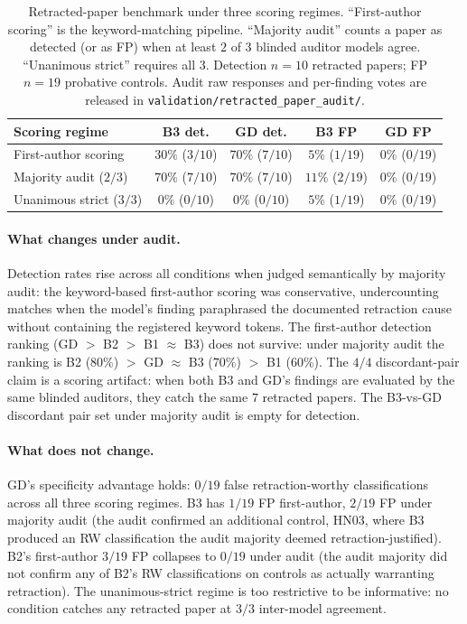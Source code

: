 \documentclass[11pt]{article}
\theoremstyle{definition}
\begin{document}
\begin{table}[ht]
\centering
\caption{Retracted-paper benchmark under three scoring regimes. ``First-author scoring'' is the keyword-matching pipeline. ``Majority audit'' counts a paper as detected (or as FP) when at least $2$ of $3$ blinded auditor models agree. ``Unanimous strict'' requires all $3$. Detection $n = 10$ retracted papers; FP $n = 19$ probative controls. Audit raw responses and per-finding votes are released in \texttt{validation/retracted\_paper\_audit/}.}
\label{tab:retracted_audit}
\small
\begin{tabular}{lcccc}
\toprule
\textbf{Scoring regime} & \textbf{B3 det.} & \textbf{GD det.} & \textbf{B3 FP} & \textbf{GD FP} \\
\midrule
First-author scoring   & $30\%$ ($3/10$) & $70\%$ ($7/10$) & $5\%$ ($1/19$)  & $0\%$ ($0/19$) \\
Majority audit ($2/3$) & $70\%$ ($7/10$) & $70\%$ ($7/10$) & $11\%$ ($2/19$) & $0\%$ ($0/19$) \\
Unanimous strict ($3/3$) & $0\%$ ($0/10$) & $0\%$ ($0/10$) & $5\%$ ($1/19$) & $0\%$ ($0/19$) \\
\bottomrule
\end{tabular}
\end{table}

\paragraph{What changes under audit.} Detection rates rise across all conditions when judged semantically by majority audit: the keyword-based first-author scoring was conservative, undercounting matches when the model's finding paraphrased the documented retraction cause without containing the registered keyword tokens. The first-author detection ranking (GD $> $ B2 $> $ B1 $\approx$ B3) does not survive: under majority audit the ranking is B2 ($80\%$) $> $ GD $\approx$ B3 ($70\%$) $> $ B1 ($60\%$). The $4/4$ discordant-pair claim is a scoring artifact: when both B3 and GD's findings are evaluated by the same blinded auditors, they catch the same $7$ retracted papers. The B3-vs-GD discordant pair set under majority audit is empty for detection.

\paragraph{What does not change.} GD's specificity advantage holds: $0/19$ false retraction-worthy classifications across all three scoring regimes. B3 has $1/19$ FP first-author, $2/19$ FP under majority audit (the audit confirmed an additional control, HN03, where B3 produced an RW classification the audit majority deemed retraction-justified). B2's first-author $3/19$ FP collapses to $0/19$ under audit (the audit majority did not confirm any of B2's RW classifications on controls as actually warranting retraction). The unanimous-strict regime is too restrictive to be informative: no condition catches any retracted paper at $3/3$ inter-model agreement.
\end{document}
